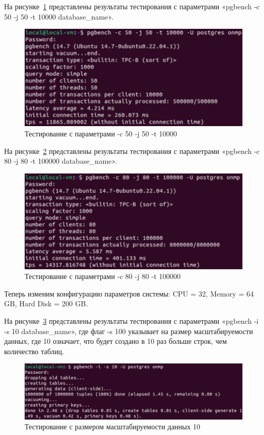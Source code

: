 На рисунке~\ref{fig:b7} представлены результаты тестирования с параметрами «pgbench -c 50 -j 50 -t 10000 database\_name».

\begin{figure}
    \includegraphics[width=16.5cm]{inc/test1_7}
    \caption{Тестирование с параметрами -c 50 -j 50 -t 10000}
    \label{fig:b7}
\end{figure}

На рисунке~\ref{fig:b8} представлены результаты тестирования с параметрами «pgbench -c 80 -j 80 -t 100000 database\_name».

\begin{figure}
    \includegraphics[width=16.5cm]{inc/test1_8}
    \caption{Тестирование с параметрами -c 80 -j 80 -t 100000}
    \label{fig:b8}
\end{figure}

Теперь изменим конфигурацию параметров системы: CPU = 32, Memory = 64 GB, Hard Disk = 200 GB.

На рисунке~\ref{fig:b9} представлены результаты тестирования с параметрами «pgbench -i -s 10 database\_name», где флаг -s 100 указывает на размер масштабируемости данных, где 10 означает, что будет создано в 10 раз больше строк, чем количество таблиц.

\begin{figure}
    \includegraphics[width=16.5cm]{inc/test2_1}
    \caption{Тестирование с размером масштабируемости данных 10}
    \label{fig:b9}
\end{figure}

